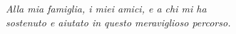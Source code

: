 \thispagestyle{empty}
\clearpage
{}
\begin{center}
  \begin{flushright}
    \begin{minipage}{.5\textwidth}
      \textit{Alla mia famiglia, i miei amici, e a chi mi ha\\ sostenuto e aiutato
      in questo meraviglioso percorso.}
    \end{minipage}
  \end{flushright}
\end{center}
\clearpage
